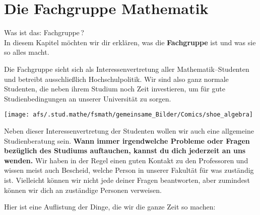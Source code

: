 \section{Die Fachgruppe Mathematik}

Was ist das: Fachgruppe\,?\\

In diesem Kapitel möchten wir dir erklären,
was die {\bf Fachgruppe} ist und was sie so alles macht.

Die Fachgruppe sieht sich als Interessenvertretung
aller Mathematik--Studenten und
betreibt ausschließlich \glqq Hochschulpolitik\grqq .
Wir sind also ganz normale Studenten,
die neben ihrem Studium noch Zeit investieren,
um für gute Studienbedingungen an unserer Universität zu sorgen.
{
}
{
\begin{center}
\texttt{[image: afs/.stud.mathe/fsmath/gemeinsame\_Bilder/Comics/shoe\_algebra]}
\end{center}
}

Neben dieser Interessenvertretung der Studenten
wollen wir auch eine allgemeine Studienberatung sein.
{\bf Wann immer irgendwelche Probleme oder Fragen
     bezüglich des Studiums auftauchen,
     kannst du dich jederzeit an uns wenden.} 
Wir haben in der Regel einen guten Kontakt zu den Professoren
und wissen meist auch Bescheid,
welche Person in unserer Fakultät für was zuständig ist.
Vielleicht können wir nicht jede deiner Fragen beantworten,
aber zumindest können wir dich an zuständige Personen verweisen.

Hier ist eine Auf\-listung der Dinge,
die wir die ganze Zeit so machen:

